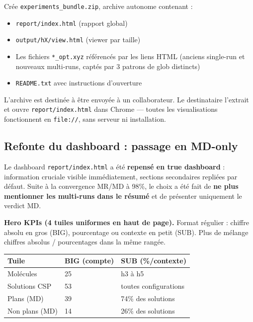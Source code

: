 Crée \texttt{experiments\_bundle.zip}, archive autonome contenant :
\begin{itemize}
  \item \texttt{report/index.html} (rapport global)
  \item \texttt{output/hX/view.html} (viewer par taille)
  \item Les fichiers \texttt{*\_opt.xyz} référencés par les liens HTML (anciens single-run et
    nouveaux multi-runs, captés par 3 patrons de glob distincts)
  \item \texttt{README.txt} avec instructions d'ouverture
\end{itemize}

L'archive est destinée à être envoyée à un collaborateur. Le destinataire l'extrait et ouvre
\texttt{report/index.html} dans Chrome — toutes les visualisations fonctionnent en
\texttt{file://}, sans serveur ni installation.

\subsection{Refonte du dashboard : passage en MD-only}


Le dashboard \texttt{report/index.html} a été \textbf{repensé en true dashboard} :
information cruciale visible immédiatement, sections secondaires repliées par défaut.
Suite à la convergence MR/MD à 98\%, le choix a été fait de \textbf{ne plus mentionner
les multi-runs dans le résumé} et de présenter uniquement le verdict MD.

\textbf{Hero KPIs (4 tuiles uniformes en haut de page).} Format régulier :
chiffre absolu en gros (BIG), pourcentage ou contexte en petit (SUB). Plus de
mélange chiffres absolus / pourcentages dans la même rangée.

\begin{center}
\begin{tabular}{lll}
  \toprule
  Tuile & BIG (compte) & SUB (\%/contexte) \\
  \midrule
  Molécules     & 25  & h3 à h5 \\
  Solutions CSP & 53  & toutes configurations \\
  \bucketplane{} Plans (MD) & 39  & 74\% des solutions \\
  \bucketnonplane{} Non plans (MD) & 14  & 26\% des solutions \\
  \bottomrule
\end{tabular}
\end{center}


